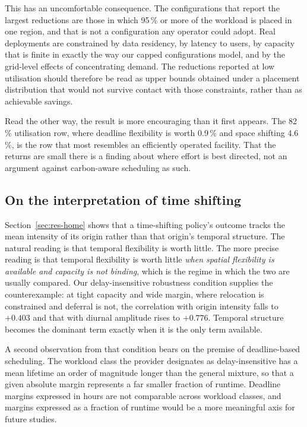 This has an uncomfortable consequence. The configurations that report the
largest reductions are those in which 95\,\% or more of the workload is placed
in one region, and that is not a configuration any operator could adopt. Real
deployments are constrained by data residency, by latency to users, by capacity
that is finite in exactly the way our capped configurations model, and by the
grid-level effects of concentrating demand. The reductions reported at low
utilisation should therefore be read as upper bounds obtained under a placement
distribution that would not survive contact with those constraints, rather than
as achievable savings.

Read the other way, the result is more encouraging than it first appears. The
82\,\% utilisation row, where deadline flexibility is worth 0.9\,\% and space
shifting 4.6\,\%, is the row that most resembles an efficiently operated
facility. That the returns are small there is a finding about where effort is
best directed, not an argument against carbon-aware scheduling as such.

\subsection{On the interpretation of time shifting}

Section~\ref{sec:res-home} shows that a time-shifting policy's outcome tracks
the mean intensity of its origin rather than that origin's temporal structure.
The natural reading is that temporal flexibility is worth little. The more
precise reading is that temporal flexibility is worth little \emph{when spatial
flexibility is available and capacity is not binding}, which is the regime in
which the two are usually compared. Our delay-insensitive robustness condition
supplies the counterexample: at tight capacity and wide margin, where
relocation is constrained and deferral is not, the correlation with origin
intensity falls to $+0.403$ and that with diurnal amplitude rises to $+0.776$.
Temporal structure becomes the dominant term exactly when it is the only term
available.

A second observation from that condition bears on the premise of deadline-based
scheduling. The workload class the provider designates as delay-insensitive has
a mean lifetime an order of magnitude longer than the general mixture, so that a
given absolute margin represents a far smaller fraction of runtime. Deadline
margins expressed in hours are not comparable across workload classes, and
margins expressed as a fraction of runtime would be a more meaningful axis for
future studies.

